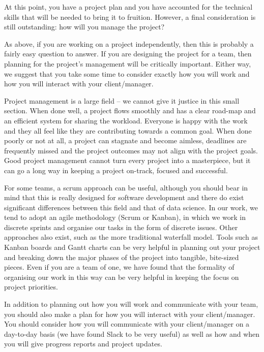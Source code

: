 \documentclass[
]{book}
\begin{document}
At this point, you have a project plan and you have accounted for the
technical skills that will be needed to bring it to fruition. However, a
final consideration is still outstanding: how will you manage the
project?

As above, if you are working on a project independently, then this is
probably a fairly easy question to answer. If you are designing the
project for a team, then planning for the project's management will be
critically important. Either way, we suggest that you take some time to
consider exactly how you will work and how you will interact with your
client/manager.

Project management is a large field -- we cannot give it justice in this
small section. When done well, a project flows smoothly and has a clear
road-map and an efficient system for sharing the workload. Everyone is
happy with the work and they all feel like they are contributing towards
a common goal. When done poorly or not at all, a project can stagnate
and become aimless, deadlines are frequently missed and the project
outcomes may not align with the project goals. Good project management
cannot turn every project into a masterpiece, but it can go a long way
in keeping a project on-track, focused and successful.

For some teams, a scrum approach can be useful, although you should bear
in mind that this is really designed for software development and there
do exist significant differences between this field and that of data
science. In our work, we tend to adopt an agile methodology (Scrum or
Kanban), in which we work in discrete sprints and organise our tasks in
the form of discrete issues. Other approaches also exist, such as the
more traditional waterfall model. Tools such as Kanban boards and Gantt
charts can be very helpful in planning out your project and breaking
down the major phases of the project into tangible, bite-sized pieces.
Even if you are a team of one, we have found that the formality of
organising our work in this way can be very helpful in keeping the focus
on project priorities.

In addition to planning out how you will work and communicate with your
team, you should also make a plan for how you will interact with your
client/manager. You should consider how you will communicate with your
client/manager on a day-to-day basis (we have found Slack to be very
useful) as well as how and when you will give progress reports and
project updates.
\end{document}
